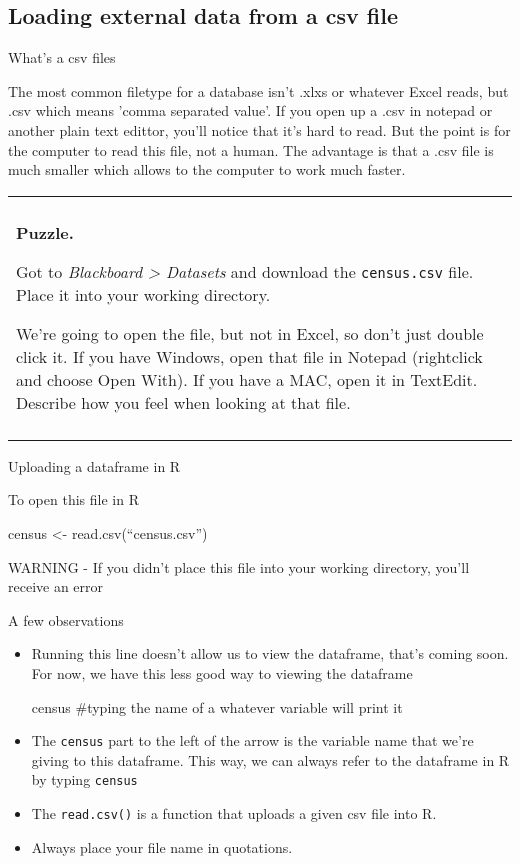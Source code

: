 \documentclass[11pt]{amsart}
\renewcommand{\(}{\left(}
\renewcommand{\)}{\right)}
\newenvironment{notes}{%
	\begin{description}[style=nextline]%
		\setlength{\itemsep}{10pt}%
		\setlength{\parskip}{2pt}%
	}
        {
	\end{description}
}
\newenvironment{puzzle}{%
	\begin{center}
		\begin{tabular}{|p{0.75\textwidth}|}
			\hline\\
			\textbf{Puzzle.}
		}%
		{%
			\\\\\hline
		\end{tabular} 
	\end{center}
}
\begin{document}
\subsection{Loading external data from a csv file}

\begin{notes}
	
\item[What's a csv files]

	The most common filetype for a database isn't .xlxs or whatever Excel reads, but .csv which means 'comma separated value'.  If you open up a .csv in notepad or another plain text edittor, you'll notice that it's hard to read.  But the point is for the computer to read this file, not a human. The advantage is that a .csv file is much smaller which allows to the computer to work much faster.  
	
	\begin{puzzle}
		Got to \textit{Blackboard > Datasets} and download the \texttt{census.csv} file. Place it into your working directory.
		
		We're going to open the file, but not in Excel, so don't just double click it. If you have Windows, open that file in Notepad 	(rightclick and choose Open With).  If you have a MAC, open it in TextEdit.  Describe how you feel when looking at that file.		
	\end{puzzle}	

\item[Uploading a dataframe in R] 

	To open this file in R
	\begin{rcode}
		census <- read.csv(``census.csv'')
	\end{rcode}

	{\color{red} WARNING - If you didn't place this file into your working directory, you'll receive an error}
	
\item[A few observations]	

	\begin{itemize}
		\item Running this line doesn't allow us to view the dataframe, that's coming soon. For now, we have this less good way to viewing the dataframe
		
		\begin{rcode}
			census #typing the name of a whatever variable will print it
		\end{rcode}
			
		\item The \texttt{census} part to the left of the arrow is the variable name that we're giving to this dataframe.  This way, we can always refer to the dataframe in R by typing \texttt{census}
		\item The \texttt{read.csv()} is a function that uploads a given csv file into R. 
		\item Always place your file name in quotations.  
	\end{itemize}	
	
\end{notes}
\end{document}
